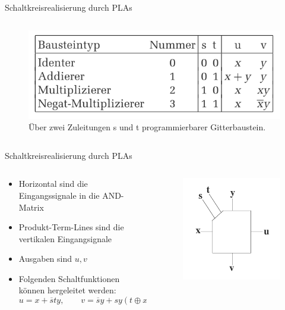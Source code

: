 \documentclass[12pt%
,xcolor=table
,aspectratio=169%
]{beamer}
\begin{document}
\begin{frame}{Schaltkreisrealisierung durch PLAs}
\begin{columns}[T]
\begin{column}{.3\textwidth}
\begin{figure}
\includegraphics[scale=0.2]{pictures/pla2}
\caption{Über zwei Zuleitungen s und t programmierbarer Gitterbaustein.}
\end{figure}
\end{column}%
\end{columns}
\end{frame}

\begin{frame}{Schaltkreisrealisierung durch PLAs}
\begin{columns}[T] %
\begin{column}{.7\textwidth}
\begin{itemize}
	\item Horizontal sind die Eingangssignale in die AND-Matrix
	\item Produkt-Term-Lines sind die vertikalen Eingangsignale
	\item Ausgaben sind $u, v$
	\item Folgenden Schaltfunktionen können hergeleitet werden:
	$$ u = x + \overline{s}ty ,\qquad v = \overline{s}y + sy(t \oplus x) $$
\end{itemize}
\end{column}%
\hfill%
\begin{column}{.4\textwidth}
\centering
\begin{figure}
\includegraphics[scale=0.275]{pictures/pla1}\\

\end{figure}
\end{column}
\end{columns}
\end{frame}
\end{document}
